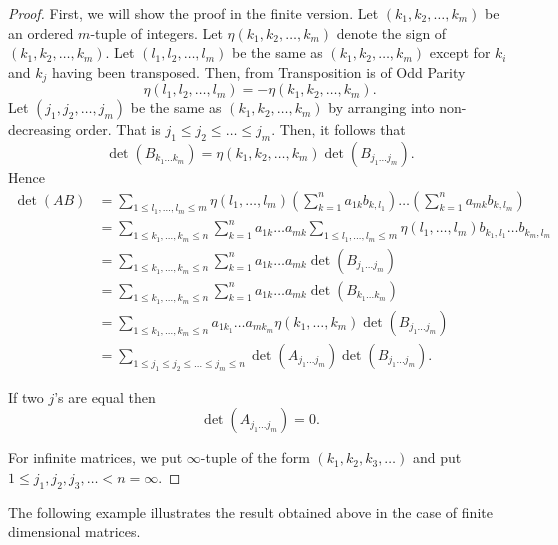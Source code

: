 \begin{proof}
First, we will show the proof in the finite version. Let $(k_1, k_2, \ldots, k_m)$ be an ordered $m$-tuple of integers. Let $\eta(k_1, k_2, \ldots, k_m)$ denote the sign of $(k_1, k_2, \ldots, k_m)$. Let $(l_1, l_2, \ldots, l_m)$ be the same as $(k_1, k_2, \ldots, k_m)$ except for $k_i$ and $k_j$ having been transposed. Then, from Transposition is of Odd Parity
\[\eta(l_1, l_2, \ldots, l_m) = -\eta(k_1, k_2, \ldots, k_m).\]
Let $(j_1, j_2, \ldots, j_m)$ be the same as $(k_1, k_2, \ldots, k_m)$ by arranging into non-decreasing order. That is $j_1 \leq j_2 \leq \ldots \leq j_m$. Then, it follows that
\[\det(B_{k_1\ldots k_m}) = \eta(k_1, k_2, \ldots, k_m) \det(B_{j_1\ldots j_m}).\]
Hence
\begin{align*}
    \det(AB) &= \sum_{1 \leq l_1, \ldots, l_m \leq m} \eta(l_1, \ldots, l_m) \left(\sum_{k=1}^n a_{1k}b_{k,l_1}\right) \ldots \left(\sum_{k=1}^n a_{mk}b_{k,l_m}\right) \\
    &= \sum_{1 \leq k_1, \ldots, k_m \leq n} \sum_{k=1}^n a_{1k} \ldots a_{mk} \sum_{1 \leq l_1, \ldots, l_m \leq m} \eta(l_1, \ldots, l_m) b_{k_1,l_1} \ldots b_{k_m,l_m} \\
    &= \sum_{1 \leq k_1, \ldots, k_m \leq n} \sum_{k=1}^n a_{1k} \ldots a_{mk} \det(B_{j_1\ldots j_m}) \\
    &= \sum_{1 \leq k_1, \ldots, k_m \leq n} \sum_{k=1}^n a_{1k} \ldots a_{mk} \det(B_{k_1\ldots k_m}) \\
    &= \sum_{1 \leq k_1, \ldots, k_m \leq n} a_{1k_1} \ldots a_{mk_m} \eta(k_1, \ldots, k_m) \det(B_{j_1\ldots j_m}) \\
    &= \sum_{1 \leq j_1 \leq j_2 \leq \ldots \leq j_m \leq n} \det(A_{j_1\ldots j_m}) \det(B_{j_1\ldots j_m}).
\end{align*}

If two $j$'s are equal then
\[\det(A_{j_1\ldots j_m}) = 0.\]

For infinite matrices, we put $\infty$-tuple of the form $(k_1, k_2, k_3, \ldots)$ and put $1 \leq j_1, j_2, j_3, \ldots < n = \infty$.
\end{proof}
      

The following example illustrates the result obtained above in the case of finite dimensional matrices. 

